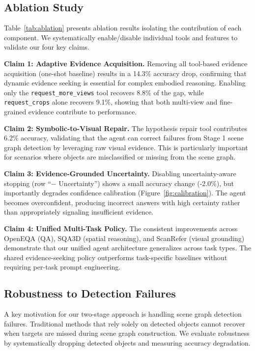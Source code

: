 \subsection{Ablation Study}

Table~\ref{tab:ablation} presents ablation results isolating the contribution of each component. We systematically enable/disable individual tools and features to validate our four key claims.

\textbf{Claim 1: Adaptive Evidence Acquisition.}
Removing all tool-based evidence acquisition (one-shot baseline) results in a 14.3\% accuracy drop, confirming that dynamic evidence seeking is essential for complex embodied reasoning.
 Enabling only the \texttt{request\_more\_views} tool recovers 8.8\% of the gap, while \texttt{request\_crops} alone recovers 9.1\%, showing that both multi-view and fine-grained evidence contribute to performance.

\textbf{Claim 2: Symbolic-to-Visual Repair.}
The hypothesis repair tool contributes 6.2\% accuracy, validating that the agent can correct failures from Stage 1 scene graph detection by leveraging raw visual evidence. This is particularly important for scenarios where objects are misclassified or missing from the scene graph.

\textbf{Claim 3: Evidence-Grounded Uncertainty.}
Disabling uncertainty-aware stopping (row ``$-$ Uncertainty'') shows a small accuracy change (-2.0\%), but importantly degrades confidence calibration (Figure~\ref{fig:calibration}). The agent becomes overconfident, producing incorrect answers with high certainty rather than appropriately signaling insufficient evidence.

\textbf{Claim 4: Unified Multi-Task Policy.}
The consistent improvements across OpenEQA (QA), SQA3D (spatial reasoning), and ScanRefer (visual grounding) demonstrate that our unified agent architecture generalizes across task types. The shared evidence-seeking policy outperforms task-specific baselines without requiring per-task prompt engineering.

\subsection{Robustness to Detection Failures}

A key motivation for our two-stage approach is handling scene graph detection failures. Traditional methods that rely solely on detected objects cannot recover when targets are missed during scene graph construction. We evaluate robustness by systematically dropping detected objects and measuring accuracy degradation.

